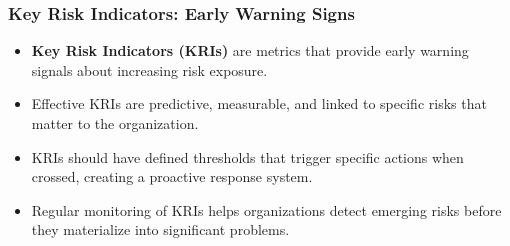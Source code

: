 \documentclass{beamer}
\begin{document}
      \begin{frame}
      \frametitle{Key Risk Indicators: Early Warning Signs}
      \begin{itemize}
        \item \textbf{Key Risk Indicators (KRIs)} are metrics that provide early warning signals about increasing risk exposure.
        \item Effective KRIs are predictive, measurable, and linked to specific risks that matter to the organization.
        \item KRIs should have defined thresholds that trigger specific actions when crossed, creating a proactive response system.
        \item Regular monitoring of KRIs helps organizations detect emerging risks before they materialize into significant problems.
      \end{itemize}
      
      \begin{center}
      \end{center}
      \end{frame}
\end{document}
